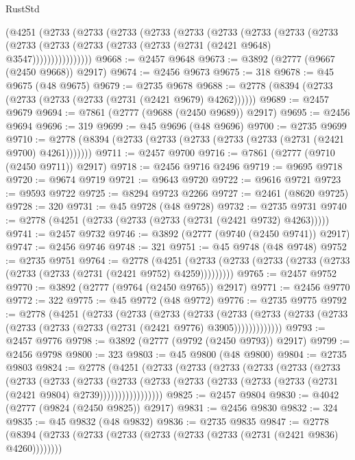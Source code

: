 \begin{lexlean}{RustStd}
\begin{coremodule}
    (@4251
      (@2733
        (@2733
          (@2733
            (@2733
              (@2733
                (@2733
                  (@2733
                    (@2733
                      (@2733
                        (@2733
                          (@2733 (@2733 (@2733 (@2733 (@2731 (@2421 @9648) @3547))))))))))))))))
@9668 := @2457 @9648
@9673 := @3892 (@2777 (@9667 (@2450 @9668)) @2917)
@9674 := @2456 @9673
@9675 := 318
@9678 := @45 @9675 (@48 @9675)
@9679 := @2735 @9678
@9688 := @2778 (@8394 (@2733 (@2733 (@2733 (@2733 (@2731 (@2421 @9679) @4262))))))
@9689 := @2457 @9679
@9694 := @7861 (@2777 (@9688 (@2450 @9689)) @2917)
@9695 := @2456 @9694
@9696 := 319
@9699 := @45 @9696 (@48 @9696)
@9700 := @2735 @9699
@9710 := @2778 (@8394 (@2733 (@2733 (@2733 (@2733 (@2733 (@2731 (@2421 @9700) @4261)))))))
@9711 := @2457 @9700
@9716 := @7861 (@2777 (@9710 (@2450 @9711)) @2917)
@9718 := @2456 @9716 @2496
@9719 := @9695 @9718
@9720 := @9674 @9719
@9721 := @9643 @9720
@9722 := @9616 @9721
@9723 := @9593 @9722
@9725 := @8294 @9723 @2266
@9727 := @2461 (@8620 @9725)
@9728 := 320
@9731 := @45 @9728 (@48 @9728)
@9732 := @2735 @9731
@9740 := @2778 (@4251 (@2733 (@2733 (@2733 (@2731 (@2421 @9732) @4263)))))
@9741 := @2457 @9732
@9746 := @3892 (@2777 (@9740 (@2450 @9741)) @2917)
@9747 := @2456 @9746
@9748 := 321
@9751 := @45 @9748 (@48 @9748)
@9752 := @2735 @9751
@9764 := @2778
    (@4251 (@2733 (@2733 (@2733 (@2733 (@2733 (@2733 (@2733 (@2731 (@2421 @9752) @4259)))))))))
@9765 := @2457 @9752
@9770 := @3892 (@2777 (@9764 (@2450 @9765)) @2917)
@9771 := @2456 @9770
@9772 := 322
@9775 := @45 @9772 (@48 @9772)
@9776 := @2735 @9775
@9792 := @2778
    (@4251
      (@2733
        (@2733
          (@2733
            (@2733
              (@2733
                (@2733 (@2733 (@2733 (@2733 (@2733 (@2733 (@2731 (@2421 @9776) @3905)))))))))))))
@9793 := @2457 @9776
@9798 := @3892 (@2777 (@9792 (@2450 @9793)) @2917)
@9799 := @2456 @9798
@9800 := 323
@9803 := @45 @9800 (@48 @9800)
@9804 := @2735 @9803
@9824 := @2778
    (@4251
      (@2733
        (@2733
          (@2733
            (@2733
              (@2733
                (@2733
                  (@2733
                    (@2733
                      (@2733
                        (@2733
                          (@2733
                            (@2733 (@2733 (@2733 (@2733 (@2731 (@2421 @9804) @2739)))))))))))))))))
@9825 := @2457 @9804
@9830 := @4042 (@2777 (@9824 (@2450 @9825)) @2917)
@9831 := @2456 @9830
@9832 := 324
@9835 := @45 @9832 (@48 @9832)
@9836 := @2735 @9835
@9847 := @2778 (@8394 (@2733 (@2733 (@2733 (@2733 (@2733 (@2733 (@2731 (@2421 @9836) @4260))))))))

\end{coremodule}
\end{lexlean}
